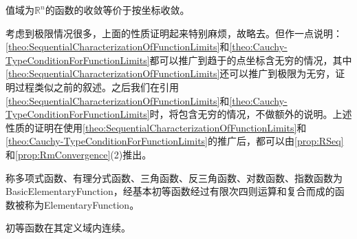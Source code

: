 \begin{property}
	值域为$\mathbb{R}^{n}$的函数的收敛等价于按坐标收敛。
\end{property}
\begin{note}
	考虑到极限情况很多，上面的性质证明起来特别麻烦，故略去。但作一点说明：\cref{theo:SequentialCharacterizationOfFunctionLimits}和\cref{theo:Cauchy-TypeConditionForFunctionLimits}都可以推广到趋于的点坐标含无穷的情况，其中\cref{theo:SequentialCharacterizationOfFunctionLimits}还可以推广到极限为无穷，证明过程类似之前的叙述。之后我们在引用\cref{theo:SequentialCharacterizationOfFunctionLimits}和\cref{theo:Cauchy-TypeConditionForFunctionLimits}时，将包含无穷的情况，不做额外的说明。上述性质的证明在使用\cref{theo:SequentialCharacterizationOfFunctionLimits}和\cref{theo:Cauchy-TypeConditionForFunctionLimits}的推广后，都可以由\cref{prop:RSeq}和\cref{prop:RmConvergence}(2)推出。
\end{note}
\begin{definition}
	称多项式函数、有理分式函数、三角函数、反三角函数、对数函数、指数函数为\gls{BasicElementaryFunction}，经基本初等函数经过有限次四则运算和复合而成的函数被称为\gls{ElementaryFunction}。
\end{definition}
\begin{theorem}\label{theo:ElementaryContinuity}
	初等函数在其定义域内连续。
\end{theorem}
